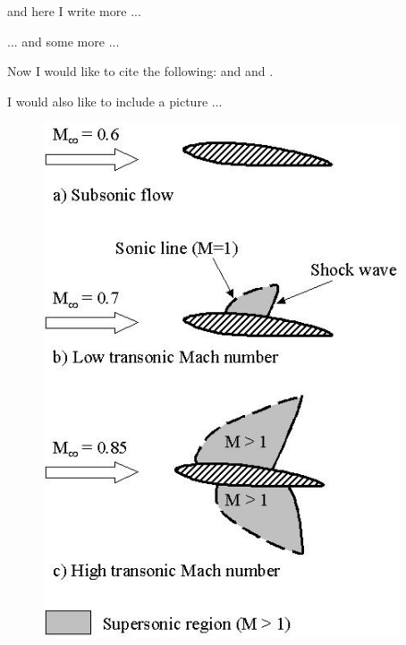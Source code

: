 and here I write more ...\cite{texbook}

... and some more ...

Now I would like to cite the following: \cite{latex} and \cite{texbook}
and \cite{Rud73}.

I would also like to include a picture ...

\begin{figure}[!htbp]
  \begin{center}
    \leavevmode
    \ifpdf
      \includegraphics[height=6in]{aflow}
    \else

\end{center}
\end{figure}
